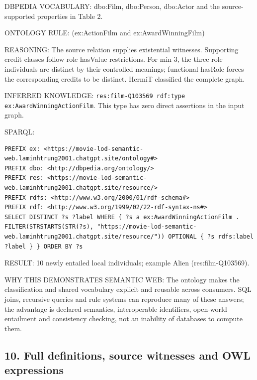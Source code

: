 \documentclass[
  11pt,
]{article}
\begin{document}
DBPEDIA VOCABULARY: dbo:Film, dbo:Person, dbo:Actor and the
source-\allowbreak{}s\allowbreak{}upported\allowbreak{} properties in
Table 2.

ONTOLOGY RULE:
(ex:\allowbreak{}\allowbreak{}Acti\allowbreak{}on\allowbreak{}Film and
ex:\allowbreak{}\allowbreak{}Award\allowbreak{}\allowbreak{}Winning\allowbreak{}F\allowbreak{}ilm)

REASONING: The source relation supplies existential witnesses.
Supporting credit classes follow role hasValue
restrict\allowbreak{}ions.\allowbreak{} For min 3, the three role
individuals are distinct by their controlled meanings; functional
hasRole forces the correspo\allowbreak{}nding credits to be distinct.
HermiT classified the complete graph.

INFERRED KNOWLEDGE:
\texttt{res:\allowbreak{}film\allowbreak{}-\allowbreak{}\allowbreak{}Q103569\allowbreak{} rdf:\allowbreak{}typ\allowbreak{}e ex:\allowbreak{}\allowbreak{}Awa\allowbreak{}rd\allowbreak{}Winnin\allowbreak{}g\allowbreak{}Action\allowbreak{}F\allowbreak{}ilm}.
This type has zero direct assertions in the input graph.

SPARQL:

\begin{verbatim}
PREFIX ex: <https://movie-lod-semantic-web.laminhtrung2001.chatgpt.site/ontology#>
PREFIX dbo: <http://dbpedia.org/ontology/>
PREFIX res: <https://movie-lod-semantic-web.laminhtrung2001.chatgpt.site/resource/>
PREFIX rdfs: <http://www.w3.org/2000/01/rdf-schema#>
PREFIX rdf: <http://www.w3.org/1999/02/22-rdf-syntax-ns#>
SELECT DISTINCT ?s ?label WHERE { ?s a ex:AwardWinningActionFilm . FILTER(STRSTARTS(STR(?s), "https://movie-lod-semantic-web.laminhtrung2001.chatgpt.site/resource/")) OPTIONAL { ?s rdfs:label ?label } } ORDER BY ?s
\end{verbatim}

RESULT: 10 newly entailed local individuals; example Alien
(res:\allowbreak{}fil\allowbreak{}m-\allowbreak{}\allowbreak{}Q10356\allowbreak{}9).\allowbreak{}

WHY THIS DEMONSTRATES SEMANTIC WEB: The ontology makes the
classifi\allowbreak{}cation and shared vocabulary explicit and reusable
across consumers. SQL joins, recursive queries and rule systems can
reproduce many of these answers; the advantage is declared semantics,
interope\allowbreak{}rable identifiers, open-world entailment and
consistency checking, not an inability of databases to compute them.

\subsection{10. Full definitions, source witnesses and OWL
expressions}\label{full-definitions-source-witnesses-and-owl-expressions}
\end{document}
